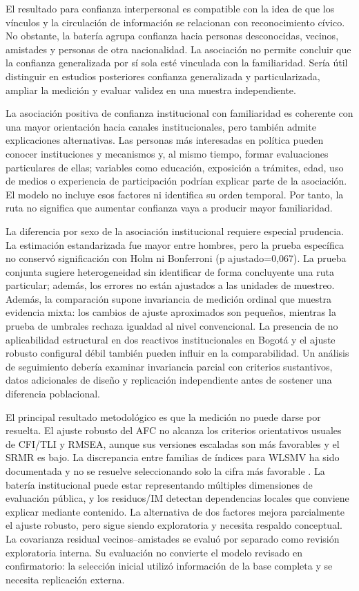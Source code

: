\documentclass[11pt,letterpaper]{article}
\begin{document}
El resultado para confianza interpersonal es compatible con la idea de que los vínculos y la circulación de información se relacionan con reconocimiento cívico. No obstante, la batería agrupa confianza hacia personas desconocidas, vecinos, amistades y personas de otra nacionalidad. La asociación no permite concluir que la confianza generalizada por sí sola esté vinculada con la familiaridad. Sería útil distinguir en estudios posteriores confianza generalizada y particularizada, ampliar la medición y evaluar validez en una muestra independiente.

La asociación positiva de confianza institucional con familiaridad es coherente con una mayor orientación hacia canales institucionales, pero también admite explicaciones alternativas. Las personas más interesadas en política pueden conocer instituciones y mecanismos y, al mismo tiempo, formar evaluaciones particulares de ellas; variables como educación, exposición a trámites, edad, uso de medios o experiencia de participación podrían explicar parte de la asociación. El modelo no incluye esos factores ni identifica su orden temporal. Por tanto, la ruta no significa que aumentar confianza vaya a producir mayor familiaridad.

La diferencia por sexo de la asociación institucional requiere especial prudencia. La estimación estandarizada fue mayor entre hombres, pero la prueba específica no conservó significación con Holm ni Bonferroni (p ajustado=0{,}067). La prueba conjunta sugiere heterogeneidad sin identificar de forma concluyente una ruta particular; además, los errores no están ajustados a las unidades de muestreo. Además, la comparación supone invariancia de medición ordinal que muestra evidencia mixta: los cambios de ajuste aproximados son pequeños, mientras la prueba de umbrales rechaza igualdad al nivel convencional. La presencia de no aplicabilidad estructural en dos reactivos institucionales en Bogotá y el ajuste robusto configural débil también pueden influir en la comparabilidad. Un análisis de seguimiento debería examinar invariancia parcial con criterios sustantivos, datos adicionales de diseño y replicación independiente antes de sostener una diferencia poblacional.

El principal resultado metodológico es que la medición no puede darse por resuelta. El ajuste robusto del AFC no alcanza los criterios orientativos usuales de CFI/TLI y RMSEA, aunque sus versiones escaladas son más favorables y el SRMR es bajo. La discrepancia entre familias de índices para WLSMV ha sido documentada y no se resuelve seleccionando solo la cifra más favorable \citep{XiaYang2019}. La batería institucional puede estar representando múltiples dimensiones de evaluación pública, y los residuos/IM detectan dependencias locales que conviene explicar mediante contenido. La alternativa de dos factores mejora parcialmente el ajuste robusto, pero sigue siendo exploratoria y necesita respaldo conceptual. La covarianza residual vecinos--amistades se evaluó por separado como revisión exploratoria interna. Su evaluación no convierte el modelo revisado en confirmatorio: la selección inicial utilizó información de la base completa y se necesita replicación externa.
\end{document}
